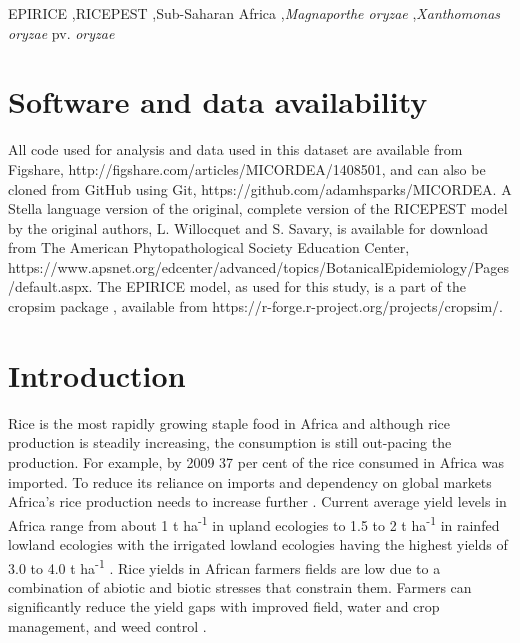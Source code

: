 \documentclass[preprint,review,12pt]{elsarticle}
\begin{document}
\begin{frontmatter}
    \begin{keyword}
    EPIRICE \sep RICEPEST \sep Sub-Saharan Africa \sep \textit{Magnaporthe oryzae} \sep \textit{Xanthomonas oryzae} pv. \textit{oryzae}
    \end{keyword}
    
    \end{frontmatter}
    
    
    
    \linenumbers
    
    \section{Software and data availability}
    All code used for analysis and data used in this dataset are available from Figshare, http://figshare.com/articles/MICORDEA/1408501, and can also be cloned from GitHub using Git, https://github.com/adamhsparks/MICORDEA. A Stella language version of the original, complete version of the RICEPEST model by the original authors, L. Willocquet and S. Savary, is available for download from The American Phytopathological Society Education Center, \\
https://www.apsnet.org/edcenter/advanced/topics/BotanicalEpidemiology/Pages/default.aspx. The EPIRICE model, as used for this study, is a part of the cropsim package \cite{Hijmans2009}, available from https://r-forge.r-project.org/projects/cropsim/.
    
    \section{Introduction}
    Rice is the most rapidly growing staple food in Africa and although rice production is steadily increasing, the consumption is still out-pacing the production. For example, by 2009 37 per cent of the rice consumed in Africa was imported. To reduce its reliance on imports and dependency on global markets Africa's rice production needs to increase further \cite{Seck2013}. Current average yield levels in Africa range from about 1 t ha\textsuperscript{-1} in upland ecologies to 1.5 to 2 t ha\textsuperscript{-1} in rainfed lowland ecologies with the irrigated lowland ecologies having the highest yields of 3.0 to 4.0 t ha\textsuperscript{-1} \cite{Diagne2013}. Rice yields in African farmers fields are low due to a combination of abiotic and biotic stresses that constrain them. Farmers can significantly reduce the yield gaps with improved field, water and crop management, and weed control \cite{Saito2013}.
    
\end{document}
